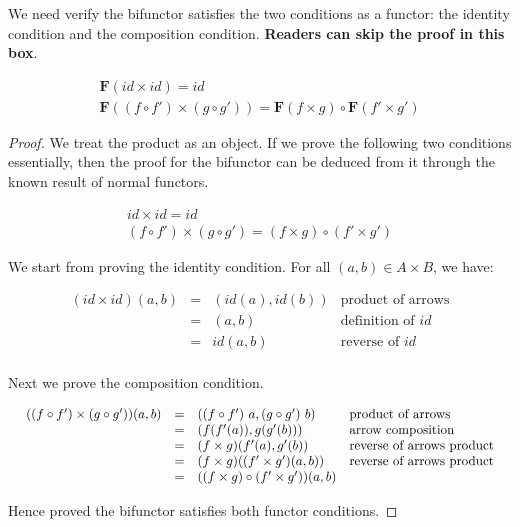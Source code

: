\documentclass[b5paper]{article}
\begin{document}
\begin{mdframed}
We need verify the bifunctor satisfies the two conditions as a functor: the identity condition and the composition condition. \textbf{Readers can skip the proof in this box}.

\[
\begin{array}{l}
\mathbf{F}(id \times id) = id \\
\mathbf{F}((f \circ f') \times (g \circ g')) = \mathbf{F}(f \times g) \circ \mathbf{F} (f' \times g')
\end{array}
\]

\begin{proof}
We treat the product as an object. If we prove the following two conditions essentially, then the proof for the bifunctor can be deduced from it through the known result of normal functors.

\[
\begin{array}{l}
id \times id = id \\
(f \circ f') \times (g \circ g') = (f \times g) \circ (f' \times g')
\end{array}
\]

We start from proving the identity condition. For all $(a, b) \in A \times B$, we have:

\[
\begin{array}{rcll}
(id \times id)(a, b) & = & (id(a), id(b)) & \text{product of arrows} \\
                     & = & (a, b) & \text{definition of $id$} \\
                     & = & id(a, b) & \text{reverse of $id$} \\
\end{array}
\]

Next we prove the composition condition.

\[
\resizebox{\textwidth}{!}{\ensuremath{
\begin{array}{rcll}
((f \circ f') \times (g \circ g'))(a, b) & = & ((f \circ f')\ a, (g \circ g')\ b) & \text{product of arrows} \\
    & = & (f(f'(a)), g(g'(b))) & \text{arrow composition} \\
    & = & (f \times g)(f'(a), g'(b)) & \text{reverse of arrows product} \\
    & = & (f \times g)((f' \times g')(a, b)) & \text{reverse of arrows product} \\
    & = & ((f \times g) \circ (f' \times g'))(a, b)
\end{array}
}}
\]

Hence proved the bifunctor satisfies both functor conditions.
\end{proof}
\end{mdframed}
\end{document}

